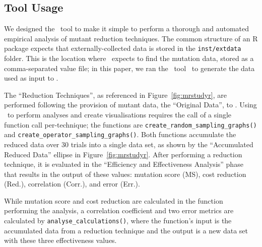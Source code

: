 \subsection{Tool Usage}




We designed the \mr~tool to make it simple to perform a thorough and automated empirical analysis of mutant reduction
techniques. The common structure of an R package expects that externally-collected data is stored in the
\texttt{inst/extdata} folder. This is the location where \mr~expects to find the mutation data, stored as a
comma-separated value file; in this paper, we ran the \sa~tool~\cite{McMinn2016} to generate the data used as input
to \mr.




The ``Reduction Techniques'', as referenced in Figure~\ref{fig:mrstudyr}, are performed following the provision of
mutant data, the ``Original Data'', to \mr. Using \mr~to perform analyses and create visualisations requires the call of
a single function call per-technique; the functions are {\texttt{create\_random\_sampling\_graphs()}} and
{\texttt{create\_operator\_sampling\_graphs()}}. Both functions accumulate the reduced data over 30 trials into a single
data set, as shown by the ``Accumulated Reduced Data'' ellipse in Figure~\ref{fig:mrstudyr}.  After performing a
reduction technique, it is evaluated in the ``Efficiency and Effectiveness Analysis'' phase that results in the output
of these values: mutation score (MS), cost reduction (Red.), correlation (Corr.), and error (Err.).


While mutation score and cost reduction are calculated in the function performing the analysis, a correlation
coefficient and two error metrics are calculated by \texttt{analyse\_calculations()}, where the function's input is the
accumulated data from a reduction technique and the output is a new data set with these three effectiveness
values.

